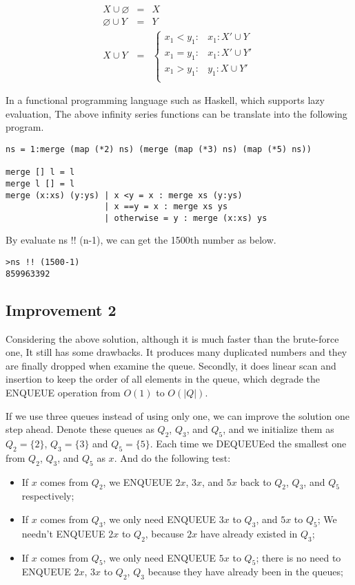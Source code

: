 \documentclass[b5paper]{article}
\begin{document}
\[
\begin{array}{rcl}
X \cup \varnothing & = & X \\
\varnothing \cup Y & = & Y \\
X \cup Y & = & \begin{cases}
  x_1 < y_1: & x_1 : X' \cup Y \\
  x_1 = y_1: & x_1 : X' \cup Y' \\
  x_1 > y_1: & y_1 : X \cup Y' \\
\end{cases}
\end{array}
\]

In a functional programming language such as Haskell, which supports
lazy evaluation, The above infinity series functions can be translate
into the following program.

\lstset{language=Haskell}
\begin{lstlisting}
ns = 1:merge (map (*2) ns) (merge (map (*3) ns) (map (*5) ns))

merge [] l = l
merge l [] = l
merge (x:xs) (y:ys) | x <y = x : merge xs (y:ys)
                    | x ==y = x : merge xs ys
                    | otherwise = y : merge (x:xs) ys
\end{lstlisting}

By evaluate ns !! (n-1), we can get the 1500th number as
below.

\begin{verbatim}
>ns !! (1500-1)
859963392
\end{verbatim}

\subsection{Improvement 2}
Considering the above solution, although it is much faster than the brute-force one,
It still has some drawbacks. It produces many duplicated numbers and they are
finally dropped when examine the queue. Secondly, it does linear scan and insertion
to keep the order of all elements in the queue, which degrade the ENQUEUE operation
from $O(1)$ to $O(|Q|)$.

If we use three queues instead of using only one, we can improve the solution one
step ahead. Denote these queues as $Q_2$, $Q_3$, and $Q_5$, and we initialize
them as $Q_2=\{ 2 \}$, $Q_3 = \{ 3\}$ and $Q_5 = \{ 5 \}$. Each time we DEQUEUEed
the smallest one from $Q_2$, $Q_3$, and $Q_5$ as $x$. And do the following test:

\begin{itemize}
\item If $x$ comes from $Q_2$, we ENQUEUE $2x$, $3x$, and $5x$ back to
$Q_2$, $Q_3$, and $Q_5$ respectively;
\item If $x$ comes from $Q_3$, we only need ENQUEUE $3x$ to $Q_3$, and $5x$ to $Q_5$;
We needn't ENQUEUE $2x$ to $Q_2$, because $2x$ have already existed in $Q_3$;
\item If $x$ comes from $Q_5$, we only need ENQUEUE $5x$ to $Q_5$; there is
no need to ENQUEUE $2x$, $3x$ to $Q_2$, $Q_3$ because they have already been
in the queues;
\end{itemize}
\end{document}
